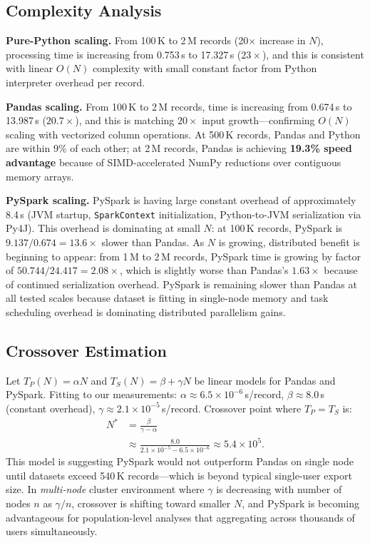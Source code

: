 \documentclass[conference]{IEEEtran}
\begin{document}
\subsection{Complexity Analysis}

\textbf{Pure-Python scaling.}
From 100\,K to 2\,M records (20$\times$ increase in $N$), processing time is increasing from 0.753\,s to 17.327\,s ($23\times$), and this is consistent with linear $O(N)$ complexity with small constant factor from Python interpreter overhead per record.

\textbf{Pandas scaling.}
From 100\,K to 2\,M records, time is increasing from 0.674\,s to 13.987\,s ($20.7\times$), and this is matching $20\times$ input growth---confirming $O(N)$ scaling with vectorized column operations. At 500\,K records, Pandas and Python are within 9\% of each other; at 2\,M records, Pandas is achieving \textbf{19.3\% speed advantage} because of SIMD-accelerated NumPy reductions over contiguous memory arrays.

\textbf{PySpark scaling.}
PySpark is having large constant overhead of approximately 8.4\,s (JVM startup, \texttt{SparkContext} initialization, Python-to-JVM serialization via Py4J). This overhead is dominating at small $N$: at 100\,K records, PySpark is $9.137 / 0.674 = \mathbf{13.6\times}$ slower than Pandas. As $N$ is growing, distributed benefit is beginning to appear: from 1\,M to 2\,M records, PySpark time is growing by factor of $50.744 / 24.417 = 2.08\times$, which is slightly worse than Pandas's $1.63\times$ because of continued serialization overhead. PySpark is remaining slower than Pandas at all tested scales because dataset is fitting in single-node memory and task scheduling overhead is dominating distributed parallelism gains.

\subsection{Crossover Estimation}

Let $T_P(N) = \alpha N$ and $T_S(N) = \beta + \gamma N$ be linear models for Pandas and PySpark. Fitting to our measurements: $\alpha \approx 6.5 \times 10^{-6}$\,s/record, $\beta \approx 8.0$\,s (constant overhead), $\gamma \approx 2.1 \times 10^{-5}$\,s/record. Crossover point where $T_P = T_S$ is:
\begin{equation}
\begin{aligned}
  N^* &= \frac{\beta}{\gamma - \alpha} \\
      &\approx \frac{8.0}{2.1\times10^{-5} - 6.5\times10^{-6}}
       \approx 5.4\times10^5.
\end{aligned}
\end{equation}
This model is suggesting PySpark would not outperform Pandas on single node until datasets exceed 540\,K records---which is beyond typical single-user export size. In \emph{multi-node} cluster environment where $\gamma$ is decreasing with number of nodes $n$ as $\gamma/n$, crossover is shifting toward smaller $N$, and PySpark is becoming advantageous for population-level analyses that aggregating across thousands of users simultaneously.
\end{document}
